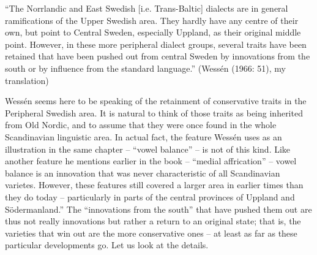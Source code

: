 “The Norrlandic and East Swedish [i.e. Trans-Baltic] dialects are in general ramifications of the Upper Swedish area. They hardly have any centre of their own, but point to Central Sweden, especially Uppland, as their original middle point. However, in these more peripheral dialect groups, several traits have been retained that have been pushed out from central Sweden by innovations from the south or by influence from the standard language.” (Wessén (1966: 51), my translation)


Wessén seems here to be speaking of the retainment of conservative traits in the Peripheral Swedish area. It is natural to think of those traits as being inherited from Old Nordic, and to assume that they were once found in the whole Scandinavian linguistic area. In actual fact, the feature Wessén uses as an illustration in the same chapter – “vowel balance” – is not of this kind. Like another feature he mentions earlier in the book – “medial affrication” – vowel balance is an innovation that was never characteristic of all Scandinavian varietes.  However, these features still covered a larger area in earlier times than they do today – particularly in parts of the central provinces of Uppland and Södermanland.” The “innovations from the south” that have pushed them out are thus not really innovations but rather a return to an original state; that is, the varieties that win out are the more conservative ones – at least as far as these particular developments go. Let us look at the details.



